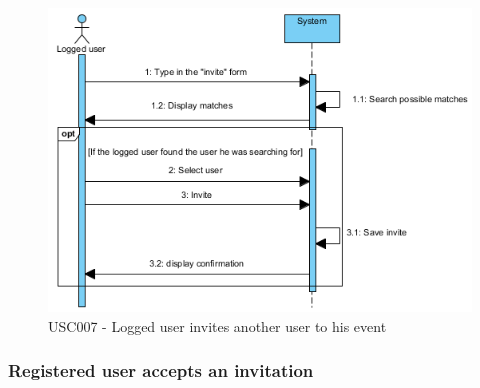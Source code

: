 \documentclass[10pt,a4paper,titlepage]{article}
\begin{document}
\begin{figure}[h]
\centering
\includegraphics[width=\linewidth]{./Sequence_diag/USC007.png}
\caption[USC007]{USC007 - Logged user invites another user to his event}
\label{fig:USC007}
\end{figure}

\clearpage
\subsubsection{Registered user accepts an invitation}
\end{document}
